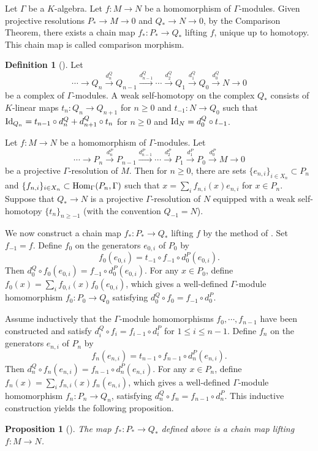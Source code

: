 \documentclass[10pt, reqno]{amsart}
\newtheorem{prop}[theorem]{Proposition}
\theoremstyle{definition}
\newtheorem{definition}[theorem]{Definition}
\theoremstyle{remark}
\numberwithin{equation}{section}
\begin{document}
Let $\Gamma$ be a $K$-algebra.  Let \(f: M \to N\) be a homomorphism of \(\Gamma\)-modules. Given projective resolutions 
$P_*\to M\to 0$ and $Q_*\to N\to 0$, by the Comparison Theorem, there exists a chain map \(f_*: P_*  \to Q_*\) lifting \(f\), unique up to homotopy. This chain map is called comparison morphism. %
\begin{definition}  [{\cite[Section 1.3]{BZZ09}}]
   Let
\[
\cdots \to Q_n \xrightarrow{d_n^Q} Q_{n-1} \xrightarrow{d_{n-1}^Q} \cdots \xrightarrow{d_2^Q} Q_1 \xrightarrow{d_1^Q} Q_0 \xrightarrow{d_0^Q} N \to 0
\] 
be a complex of \(\Gamma\)-modules. A weak self-homotopy on the complex \(Q_*\) consists of \(K\)-linear maps \(t_n:Q_n\to Q_{n+1}\) for \(n\ge 0\) and \(t_{-1}: N \to Q_0\) such that \(\mathrm{Id}_{Q_n}=t_{n-1}\circ d_n^Q+d_{n+1}^Q\circ t_n\) for \(n\ge 0\) and \(\mathrm{Id}_N=d_0^Q\circ t_{-1}\).
\end{definition}

Let \(f: M\to N\) be a homomorphism of \(\Gamma\)-modules. Let 
\[
\cdots \to P_n \xrightarrow{d_n^P} P_{n-1} \xrightarrow{d_{n-1}^P} \cdots \xrightarrow{d_2^P} P_1 \xrightarrow{d_1^P} P_0 \xrightarrow{d_0^P} M \to 0
\] 
be a projective \(\Gamma\)-resolution of \(M\). Then for \(n\ge 0\), there are sets \(\{e_{n,i}\}_{i \in X_n} \subset P_n\) and \(\{f_{n,i}\}_{i \in X_n} \subset \mathrm{Hom}_{\Gamma}(P_n, \Gamma)\) such that \(x=\sum_i f_{n,i}(x)e_{n,i}\) for \(x\in P_n\). Suppose that $Q_* \to N$
is a projective \(\Gamma\)-resolution of \(N\) equipped with a weak self-homotopy \(\{t_n\}_{n\ge -1}\) (with the convention \(Q_{-1}=N\)). 


We now construct a chain map \(f_*:P_* \to Q_*\) lifting \(f\) by the method of \cite{IIVZ15}. Set \(f_{-1}=f\). Define \(f_0\) on the generators \(e_{0,i}\) of \(P_0\) by
\[f_0(e_{0,i})=t_{-1}\circ f_{-1}\circ d_0^P(e_{0,i}).\]
Then \(d_0^Q\circ f_0(e_{0,i})=f_{-1}\circ d_0^P(e_{0,i})\). For any \(x \in P_0\), define \(f_0(x)=\sum_i f_{0,i}(x)f_0(e_{0,i})\), which gives a well-defined \(\Gamma\)-module homomorphism \(f_0:P_0 \to Q_0\) satisfying \(d_0^Q\circ f_0=f_{-1}\circ d_0^P\).

Assume inductively that the \(\Gamma\)-module homomorphisms \(f_0,\cdots, f_{n-1}\) have been constructed and satisfy \(d_i^Q\circ f_i=f_{i-1}\circ d_i^P\) for \(1 \le i \le n-1\). Define \(f_n\) on the generators \(e_{n,i}\) of \(P_n\) by 
\[f_n(e_{n,i})=t_{n-1}\circ f_{n-1}\circ d_n^P(e_{n,i}).\]
Then \(d_n^Q\circ f_n(e_{n,i})=f_{n-1}\circ d_n^P(e_{n,i})\). For any \(x \in P_n\), define \(f_n(x)=\sum_i f_{n,i}(x)f_n(e_{n,i})\), which gives a well-defined \(\Gamma\)-module homomorphism \(f_n: P_n\to Q_n\), satisfying \(d_n^Q\circ f_n=f_{n-1}\circ d_n^P\). This inductive construction yields the following proposition.
\begin{prop}[{\cite[Proposition 2.2]{IIVZ15}}]
    The map \(f_*:P_* \to Q_*\) defined above is a chain map lifting $f: M\to N$.
\end{prop}
\end{document}
